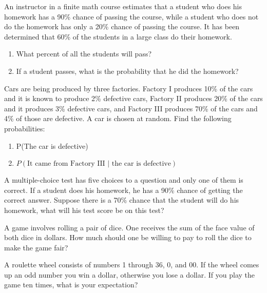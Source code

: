 \begin{puzzle}
    An instructor in a finite math course estimates that a student who does his homework has a 90\% chance of passing the course, while a student who does not do the homework has only a 20\% chance of passing the course. It has been determined that 60\% of the students in a large class do their homework.
    \begin{enumerate}
        \item What percent of all the students will pass?
        \item If a student passes, what is the probability that he did the homework?
    \end{enumerate}
\end{puzzle}

\begin{puzzle}
    Cars are being produced by three factories. Factory I produces 10\% of the cars and it is known to produce 2\% defective cars, Factory II produces 20\% of the cars and it produces 3\% defective cars, and Factory III produces 70\% of the cars and 4\% of those are defective. A car is chosen at random. Find the following probabilities:
    \begin{enumerate}
        \item P(The car is defective)
        \item \( P(\text{It came from Factory III } | \text{ the car is defective}) \)
    \end{enumerate}
\end{puzzle}

\begin{puzzle}
    A multiple-choice test has five choices to a question and only one of them is correct. If a student does his homework, he has a 90\% chance of getting the correct answer. Suppose there is a 70\% chance that the student will do his homework, what will his test score be on this test?
\end{puzzle}

\begin{puzzle}
    A game involves rolling a pair of dice. One receives the sum of the face value of both dice in dollars. How much should one be willing to pay to roll the dice to make the game fair?
\end{puzzle}

\begin{puzzle}
    A roulette wheel consists of numbers 1 through 36, 0, and 00. If the wheel comes up an odd number you win a dollar, otherwise you lose a dollar. If you play the game ten times, what is your expectation?
\end{puzzle}

